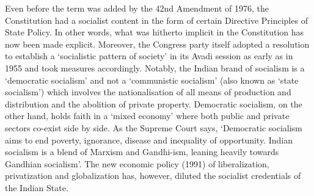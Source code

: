 \begin{multicol}{2}
Even before the term was added by the 42nd Amendment of 1976, the Constitution had a socialist content in the form of certain Directive Principles of State Policy. In other words, what was hitherto implicit in the Constitution has now been made explicit. Moreover, the Congress party itself adopted a resolution to establish a `socialistic pattern of society' in its Avadi session as early as in 1955 and took measures accordingly. Notably, the Indian brand of socialism is a `democratic socialism' and not a `communistic socialism' (also known as `state socialism') which involves the nationalisation of all means of production and distribution and the abolition of private property. Democratic socialism, on the other hand, holds faith in a `mixed economy' where both public and private sectors co-exist side by side. As the Supreme Court says, `Democratic socialism aims to end poverty, ignorance, disease and inequality of opportunity. Indian socialism is a blend of Marxism and Gandhi-ism, leaning heavily towards Gandhian socialism'. The new economic policy (1991) of liberalization, privatization and globalization has, however, diluted the socialist credentials of the Indian State.


\printendnotes

\end{multicol}

\cleardoublepage

%


